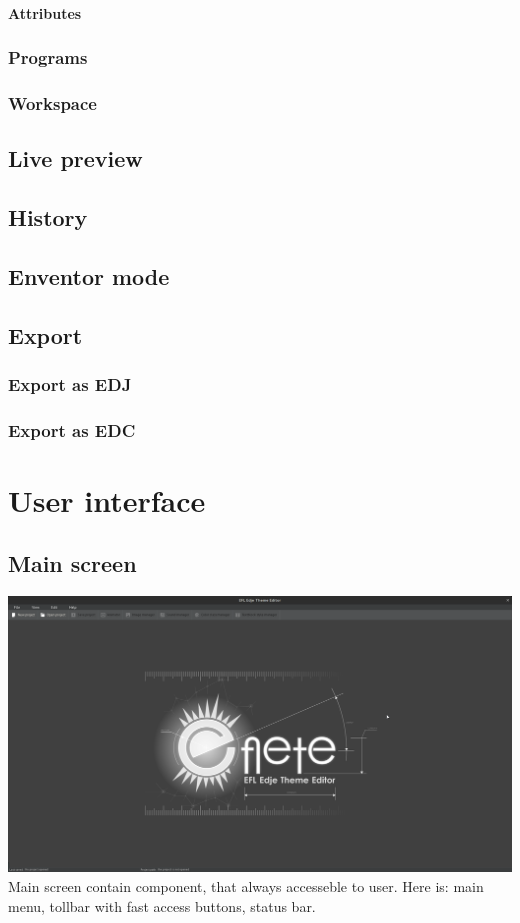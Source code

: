 \documentclass[titlepage,oneside,11pt]{book}
\begin{document}
\subsubsection{Attributes}
\subsection{Programs}
\subsection{Workspace}
\section{Live preview}
\section{History}
\section{Enventor mode}
\section{Export}
\subsection{Export as EDJ}
\subsection{Export as EDC}
\chapter{User interface}
\section{Main screen}
\includegraphics[scale=0.2]{images/main_screen.png}
Main screen contain component, that always accesseble to user. Here is: main menu, tollbar with fast access buttons, status bar.
\end{document}
